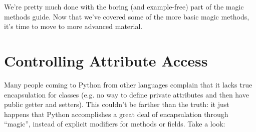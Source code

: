 \documentclass[a4paper,11pt]{article}
\begin{document}
\noindent
We're pretty much done with the boring (and example-free) part of the magic methods guide. Now that we've covered some of the more basic magic methods, it's time to move to more advanced material.

\section{Controlling Attribute Access}

Many people coming to Python from other languages complain that it lacks true encapsulation for classes (e.g. no way to define private attributes and then have public getter and setters). This couldn't be farther than the truth: it just happens that Python accomplishes a great deal of encapsulation through ``magic'', instead of explicit modifiers for methods or fields. Take a look:
\end{document}
